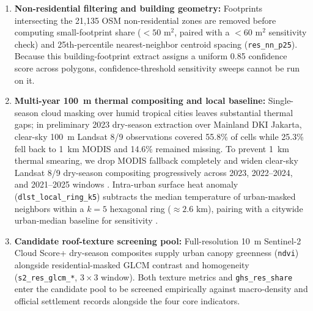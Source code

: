 \begin{enumerate}
    \item \textbf{Non-residential filtering and building geometry:} Footprints intersecting the 21,135 OSM non-residential zones are removed before computing small-footprint share ($<50\text{ m}^2$, paired with a $<60\text{ m}^2$ sensitivity check) and 25th-percentile nearest-neighbor centroid spacing (\texttt{res\_nn\_p25}). Because this building-footprint extract assigns a uniform 0.85 confidence score across polygons, confidence-threshold sensitivity sweeps cannot be run on it.
    \item \textbf{Multi-year 100~m thermal compositing and local baseline:} Single-season cloud masking over humid tropical cities leaves substantial thermal gaps; in preliminary 2023 dry-season extraction over Mainland DKI Jakarta, clear-sky 100~m Landsat 8/9 observations covered 55.8\% of cells while 25.3\% fell back to 1~km MODIS and 14.6\% remained missing. To prevent 1~km thermal smearing, we drop MODIS fallback completely and widen clear-sky Landsat 8/9 dry-season compositing progressively across 2023, 2022--2024, and 2021--2025 windows \citep{Voogt2003}. Intra-urban surface heat anomaly (\texttt{dlst\_local\_ring\_k5}) subtracts the median temperature of urban-masked neighbors within a $k=5$ hexagonal ring ($\approx 2.6\text{ km}$), pairing with a citywide urban-median baseline for sensitivity \citep{Chakraborty2019a, Stewart2012}.
    \item \textbf{Candidate roof-texture screening pool:} Full-resolution 10~m Sentinel-2 Cloud Score+ dry-season composites supply urban canopy greenness (\texttt{ndvi}) alongside residential-masked GLCM contrast and homogeneity (\texttt{s2\_res\_glcm\_*}, $3\times3$ window). Both texture metrics and \texttt{ghs\_res\_share} enter the candidate pool to be screened empirically against macro-density and official settlement records alongside the four core indicators.
\end{enumerate}

